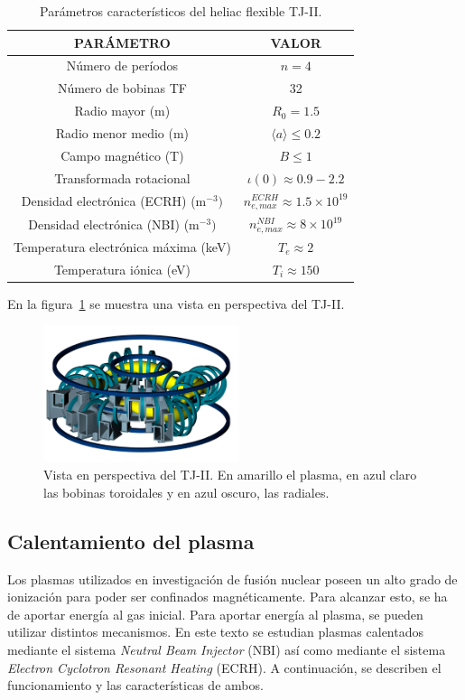 \begin{table}[H]
    \centering
    \begin{tabular}{cc}
    \hline
    PARÁMETRO & VALOR \\ \hline
    Número de períodos          & $n=4$       \\
    Número de bobinas TF          & 32       \\
    Radio mayor (m)          & $R_0=1.5$      \\
    Radio menor medio (m)          & $\langle a\rangle\leq 0.2$       \\
    Campo magnético (T)          & $B\leq 1$       \\
    Transformada rotacional          & $\iota(0)\approx0.9-2.2$       \\
    Densidad electrónica (ECRH) (m$^{-3})$          & $n^{ECRH}_{e,max}\approx 1.5\times 10^{19}$       \\
    Densidad electrónica (NBI) (m$^{-3})$          & $n^{NBI}_{e,max}\approx 8\times 10^{19}$       \\
    Temperatura electrónica máxima (keV)          & $T_e\approx 2$      \\
    Temperatura iónica (eV)          & $T_i\approx 150$      \\ \hline
    \end{tabular}
    \caption{Parámetros característicos del heliac flexible TJ-II.}
    \label{tab:tj2}
\end{table}
En la figura~\ref{fig:view} se muestra una vista en perspectiva del TJ-II.
\begin{figure}[h!]
    \centering
    \includegraphics[height=4cm]{img/view.png}
    \caption[Vista en perspectiva del TJ-II]{Vista en perspectiva del TJ-II. En amarillo el plasma, en azul claro las bobinas toroidales y en azul oscuro, las radiales.}
    \label{fig:view}
\end{figure}
\subsection{Calentamiento del plasma}
Los plasmas utilizados en investigación de fusión nuclear poseen un alto grado de ionización 
para poder ser confinados magnéticamente. Para alcanzar esto, se ha de aportar energía al
gas inicial.
Para aportar energía al plasma, se pueden utilizar distintos mecanismos. En este texto se estudian
plasmas calentados mediante el sistema \textit{Neutral Beam Injector} (NBI) así como mediante
el sistema \textit{Electron Cyclotron Resonant Heating} (ECRH). A continuación, se describen
el funcionamiento y las características de ambos.

